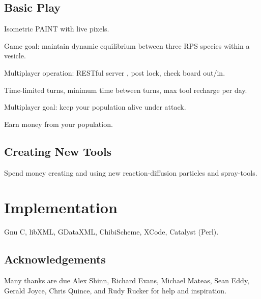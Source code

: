 \documentclass{acm_proc_article-sp}
\begin{document}
\subsection{Basic Play}

Isometric PAINT with live pixels.

Game goal: maintain dynamic equilibrium between three RPS species within a vesicle.

Multiplayer operation: RESTful server \cite{RESTthesis}, post lock, check board out/in.

Time-limited turns, minimum time between turns, max tool recharge per day.

Multiplayer goal: keep your population alive under attack.

Earn money from your population.

\subsection{Creating New Tools}

Spend money creating and using new reaction-diffusion particles and spray-tools.

\section{Implementation}

Gnu C, libXML, GDataXML, ChibiScheme, XCode, Catalyst (Perl).

\subsection{Acknowledgements}

Many thanks are due Alex Shinn, Richard Evans, Michael Mateas, Sean Eddy, Gerald Joyce, Chris Quince,
and Rudy Rucker for help and inspiration.




\balancecolumns
\end{document}
